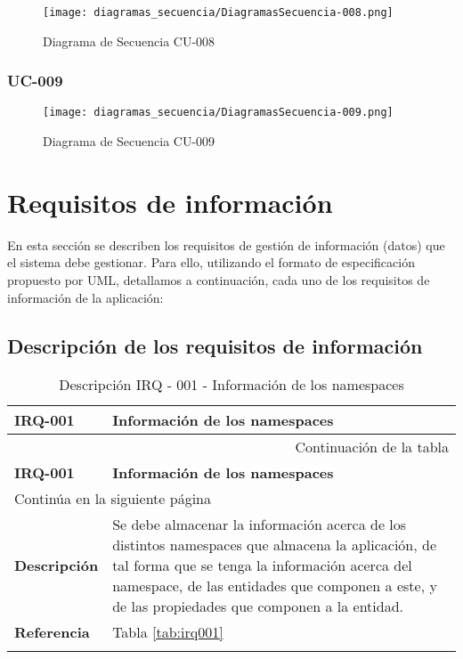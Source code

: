 \begin{figure}[H]
    \begin{center}
        \texttt{[image: diagramas\_secuencia/DiagramasSecuencia-008.png]}
    \end{center}
    \caption{Diagrama de Secuencia CU-008}
    \label{fig:DSCU-008}
\end{figure}

\subsubsection{UC-009 }

\begin{figure}[H]
    \begin{center}
        \texttt{[image: diagramas\_secuencia/DiagramasSecuencia-009.png]}
    \end{center}
    \caption{Diagrama de Secuencia CU-009}
    \label{fig:DSCU-009}
\end{figure}


\section{Requisitos de información}

En esta sección se describen los requisitos de gestión de información (datos)
que el sistema debe gestionar. Para ello, utilizando el formato de
especificación propuesto por UML, detallamos a continuación, cada uno de los
requisitos de información de la aplicación:

\subsection{Descripción de los requisitos de información}

\begin{center}
\begin{longtable}{||p{3.4cm}|p{12cm}||}
 \hline \hline \bf IRQ-001 &  \bf Información de los namespaces \\
\hline
\endfirsthead
\hline \multicolumn{2}{|r|}{{Continuación de la tabla}} \\ \hline
 \hline \bf IRQ-001 &  \bf Información de los namespaces \\
\hline
\endhead
\hline \multicolumn{2}{|l|}{{Continúa en la siguiente página}} \\ \hline
\endfoot
\endlastfoot
 \hline \bf Descripción & Se debe almacenar la información acerca de los
             distintos namespaces que almacena la aplicación, de tal forma que
             se tenga la información acerca del namespace, de las entidades que
             componen a este, y de las propiedades que componen a la entidad.\\
 \hline \bf Referencia & Tabla \ref{tab:irq001}\\
\hline
\hline
\caption{\label{tab:irq001-red} Descripción IRQ - 001 - Información de los namespaces} 
\end{longtable}
\end{center}

